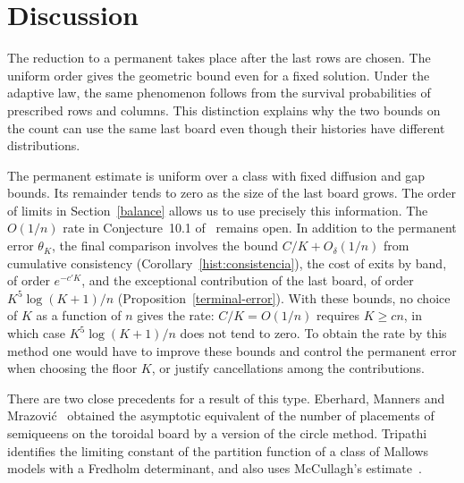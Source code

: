 \section{Discussion}
The reduction to a permanent takes place after the last rows are chosen. The uniform order gives
the geometric bound even for a fixed solution. Under the adaptive law, the same phenomenon follows
from the survival probabilities of prescribed rows and columns. This distinction explains why the
two bounds on the count can use the same last board even though their histories have different
distributions.

The permanent estimate is uniform over a class with fixed diffusion and gap bounds. Its remainder
tends to zero as the size of the last board grows. The order of limits in Section~\ref{balance}
allows us to use precisely this information. The $O(1/n)$ rate in Conjecture~10.1 of~\cite{pred}
remains open. In addition to the permanent error $\theta_K$, the final comparison involves the bound
$C/K+O_\delta(1/n)$ from cumulative consistency (Corollary~\ref{hist:consistencia}), the cost of exits
by band, of order $e^{-c'K}$, and the exceptional contribution of the last board, of order
$K^5\log(K+1)/n$ (Proposition~\ref{terminal-error}). With these bounds, no choice of $K$ as a
function of $n$ gives the rate: $C/K=O(1/n)$ requires $K\ge cn$, in which case
$K^5\log(K+1)/n$ does not tend to zero. To obtain the rate by this method one would have to improve
these bounds and control the permanent error when choosing the floor $K$, or justify cancellations
among the contributions.

There are two close precedents for a result of this type. Eberhard, Manners and
Mrazović~\cite{emm} obtained the asymptotic equivalent of the number of placements of semiqueens
on the toroidal board by a version of the circle method. Tripathi~\cite{tripathi} identifies the
limiting constant of the partition function of a class of Mallows models with a Fredholm
determinant, and also uses McCullagh's estimate~\cite{mccullagh}.
